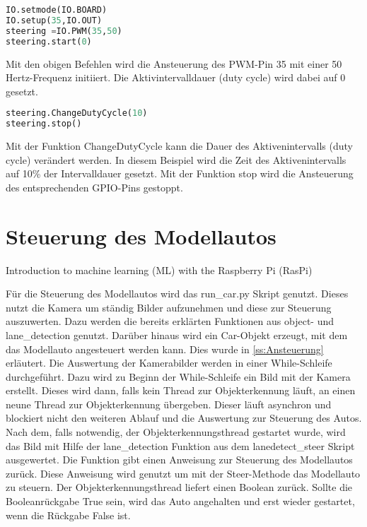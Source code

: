 \begin{lstlisting}[language=Python]
IO.setmode(IO.BOARD)
IO.setup(35,IO.OUT)
steering =IO.PWM(35,50)
steering.start(0)
\end{lstlisting}
Mit den obigen Befehlen wird die Ansteuerung des \ac{PWM}-Pin 35 mit einer 50 Hertz-Frequenz initiiert. Die Aktivintervalldauer (duty cycle) wird dabei auf 0 gesetzt.

\begin{lstlisting}[language=Python]
steering.ChangeDutyCycle(10)
steering.stop()
\end{lstlisting}
Mit der Funktion ChangeDutyCycle kann die Dauer des Aktivenintervalls (duty cycle) verändert werden. In diesem Beispiel wird die Zeit des Aktivenintervalls auf 10\% der Intervalldauer gesetzt. Mit der Funktion stop wird die Ansteuerung des entsprechenden \ac{GPIO}-Pins gestoppt.


\section{Steuerung des Modellautos}

Introduction to machine learning (ML) with the Raspberry Pi (RasPi)

Für die Steuerung des Modellautos wird das run\_car.py Skript genutzt. Dieses nutzt die Kamera um ständig Bilder aufzunehmen und diese zur Steuerung auszuwerten. Dazu werden die bereits erklärten Funktionen aus object- und lane\_detection genutzt. Darüber hinaus wird ein Car-Objekt erzeugt, mit dem das Modellauto angesteuert werden kann. Dies wurde in \ref{ss:Ansteuerung} erläutert.
\newline
Die Auswertung der Kamerabilder werden in einer While-Schleife durchgeführt. Dazu wird zu Beginn der While-Schleife ein Bild mit der Kamera erstellt. Dieses wird dann, falls kein Thread zur Objekterkennung läuft, an einen neune Thread zur Objekterkennung übergeben. Dieser läuft asynchron und blockiert nicht den weiteren Ablauf und die Auswertung zur Steuerung des Autos. Nach dem, falls notwendig, der Objekterkennungsthread gestartet wurde, wird das Bild mit Hilfe der lane_detection Funktion aus dem lanedetect_steer Skript ausgewertet. Die Funktion gibt einen Anweisung zur Steuerung des Modellautos zurück. Diese Anweisung wird genutzt um mit der Steer-Methode das Modellauto zu steuern. Der Objekterkennungsthread liefert einen Boolean zurück. Sollte die Booleanrückgabe True sein, wird das Auto angehalten und erst wieder gestartet, wenn die Rückgabe False ist. 